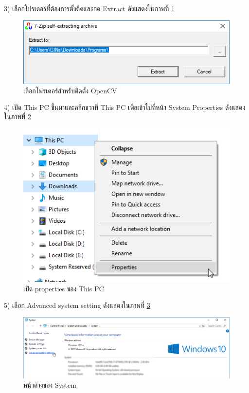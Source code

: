     3) เลือกโปรเดอร์ที่ต้องการตั้งติดและกด Extract ดังแสดงในภาพที่ \ref{Fig:opencvInstall3}
      \begin{figure}[H]
          \includegraphics[width=\columnwidth]{Figures/7/9}
          \caption{เลือกโฟรเดอร์สำหรับติดตั้ง OpenCV}
          \label{Fig:opencvInstall3}
      \end{figure}

    4) เปิด This PC ขึ้นมาและคลิกขวาที่ This PC เพื่อเข้าไปที่หน้า System Properties ดังแสดงในภาพที่ \ref{Fig:opencvInstall4}
      \begin{figure}[H]
          \includegraphics[width=\columnwidth]{Figures/7/10}
          \caption{เปิด properties ของ This PC}
          \label{Fig:opencvInstall4}
      \end{figure}

    5) เลือก Advanced system setting ดังแสดงในภาพที่ \ref{Fig:opencvInstall5}
        \begin{figure}[H]
            \includegraphics[width=\columnwidth]{Figures/7/11}
            \caption{หน้าต่างของ System}
            \label{Fig:opencvInstall5}
        \end{figure}

